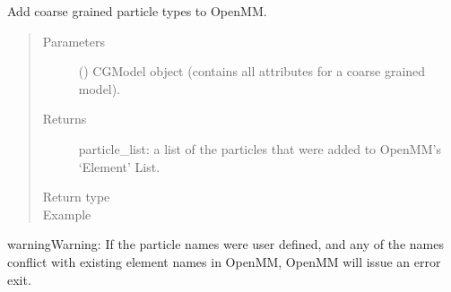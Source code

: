 \documentclass[letterpaper,12pt,english,openany,oneside]{sphinxmanual}
\begin{document}
\begin{fulllineitems}
\label{\detokenize{build:build.cg_build.add_new_elements}}
Add coarse grained particle types to OpenMM.
\begin{quote}\begin{description}
\item[{Parameters}] \leavevmode
{} () \textendash{} CGModel object (contains all attributes for a coarse grained model).

\item[{Returns}] \leavevmode
particle\_list: a list of the particles that were added to OpenMM’s ‘Element’ List.

\item[{Return type}] \leavevmode
{}

\item[{Example}] \leavevmode
\end{description}\end{quote}

\begin{sphinxVerbatim}[commandchars=\\\{\}]
   
  
  
\end{sphinxVerbatim}

\begin{sphinxadmonition}{warning}{Warning:}
If the particle names were user defined, and any of the names conflict with existing element names in OpenMM, OpenMM will issue an error exit.
\end{sphinxadmonition}

\end{fulllineitems}

\end{document}

